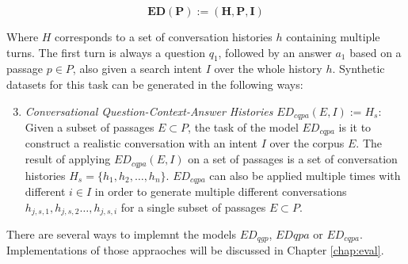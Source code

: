 \begin{equation}
    \mathbf{ED(P) := (H, P, I)}
    \label{eq:task_conversation}
\end{equation}

Where $H$ corresponds to a set of conversation histories $h$ containing multiple turns. The first turn is always a question $q_1$, followed by an answer $a_1$ based on a passage $p \in P$, also given a search intent $I$ over the whole history $h$. Synthetic datasets for this task can be generated in the following ways:

\begin{enumerate}
    \setcounter{enumi}{2} %
    \item \textit{Conversational Question-Context-Answer Histories} $ED_{cqpa}(E, I) := H_s$: Given a subset of passages $E \subset P$, the task of the model $ED_{cqpa}$ is it to construct a realistic conversation with an intent $I$ over the corpus $E$. The result of applying $ED_{cqpa}(E,I)$ on a set of passages is a set of conversation histories $H_s = \{h_1, h_2, \dots, h_n\}$. $ED_{cqpa}$ can also be applied multiple times with different $i \in I$ in order to generate multiple different conversations $h_{j,s,1}, h_{j,s,2} \dots , h_{j,s,i}$ for a single subset of passages $E \subset P$.
\end{enumerate}

There are several ways to implemnt the models $ED_{qgp}$, $ED{qpa}$ or $ED_{cqpa}$. Implementations of those appraoches will be discussed in Chapter \ref{chap:eval}. 



    
